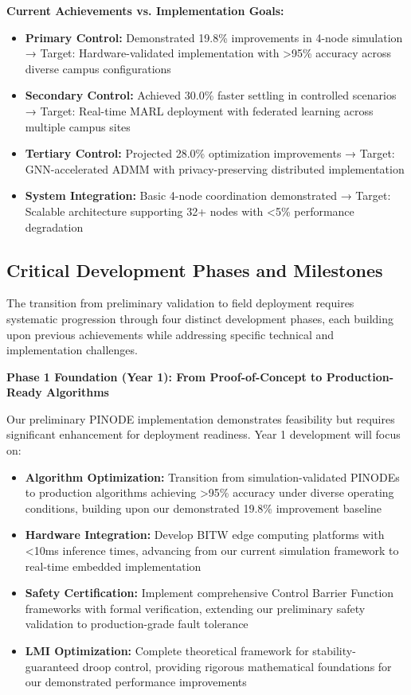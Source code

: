 \documentclass[12pt]{article}
\begin{document}
\textbf{Current Achievements vs. Implementation Goals:}

\begin{itemize}
\item \textbf{Primary Control:} Demonstrated 19.8\% improvements in 4-node simulation → Target: Hardware-validated implementation with >95\% accuracy across diverse campus configurations
\item \textbf{Secondary Control:} Achieved 30.0\% faster settling in controlled scenarios → Target: Real-time MARL deployment with federated learning across multiple campus sites  
\item \textbf{Tertiary Control:} Projected 28.0\% optimization improvements → Target: GNN-accelerated ADMM with privacy-preserving distributed implementation
\item \textbf{System Integration:} Basic 4-node coordination demonstrated → Target: Scalable architecture supporting 32+ nodes with <5\% performance degradation
\end{itemize}

\subsection{Critical Development Phases and Milestones}

The transition from preliminary validation to field deployment requires systematic progression through four distinct development phases, each building upon previous achievements while addressing specific technical and implementation challenges.

\textbf{Phase 1 Foundation (Year 1): From Proof-of-Concept to Production-Ready Algorithms}

Our preliminary PINODE implementation demonstrates feasibility but requires significant enhancement for deployment readiness. Year 1 development will focus on:

\begin{itemize}
\item \textbf{Algorithm Optimization:} Transition from simulation-validated PINODEs to production algorithms achieving >95\% accuracy under diverse operating conditions, building upon our demonstrated 19.8\% improvement baseline
\item \textbf{Hardware Integration:} Develop BITW edge computing platforms with <10ms inference times, advancing from our current simulation framework to real-time embedded implementation
\item \textbf{Safety Certification:} Implement comprehensive Control Barrier Function frameworks with formal verification, extending our preliminary safety validation to production-grade fault tolerance
\item \textbf{LMI Optimization:} Complete theoretical framework for stability-guaranteed droop control, providing rigorous mathematical foundations for our demonstrated performance improvements
\end{itemize}
\end{document}
